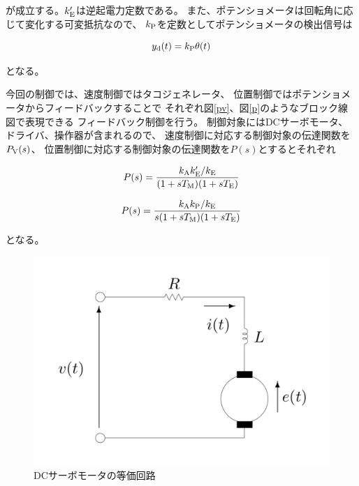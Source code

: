\documentclass[uplatex, 11pt,a4j, titlepage]{jsarticle}
\begin{document}
が成立する。$k'_{\rm E}$は逆起電力定数である。
また、ポテンショメータは回転角に応じて変化する可変抵抗なので、
$k_{\rm P}$を定数としてポテンショメータの検出信号は

\begin{equation}\label{ninteen}
    y_{\rm d}(t) = k_{\rm P}\theta(t)
\end{equation}

となる。

今回の制御では、速度制御ではタコジェネレータ、
位置制御ではポテンショメータからフィードバックすることで
それぞれ図\ref{pv}、図\ref{p}のようなブロック線図で表現できる
フィードバック制御を行う。
制御対象にはDCサーボモータ、ドライバ、操作器が含まれるので、
速度制御に対応する制御対象の伝達関数を$P_{\rm V}(s)$、
位置制御に対応する制御対象の伝達関数を$P(s)$とするとそれぞれ

\begin{equation}\label{twentythree}
    P(s) =\frac{k_{\rm A}k'_{\rm E}/k_{\rm E}}{(1+sT_{\rm M})(1+sT_{\rm E})} 
\end{equation}

\begin{equation}\label{twentyfour}
    P(s) =\frac{k_{\rm A}k_{\rm P}/k_{\rm E}}{s(1+sT_{\rm M})(1+sT_{\rm E})} 
\end{equation}

となる。

\begin{figure}[h]
    \centering
    \includegraphics[width=12cm]{dc_eq.pdf}
    \caption{DCサーボモータの等価回路}
    \label{dc_eq}
\end{figure}
\end{document}
